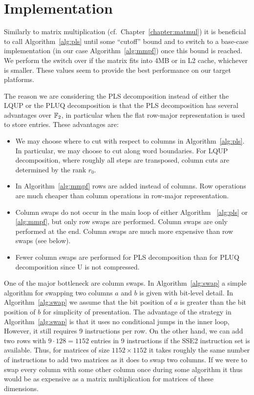 \section{Implementation}
\label{sec:pluq-implementation}
Similarly to matrix multiplication (cf.\ Chapter~\ref{chapter:matmul}) it is beneficial to call Algorithm~\ref{alg:pls} until some ``cutoff'' bound and to switch to a base-case implementation (in our case Algorithm~\ref{alg:mmpf}) once this bound is reached. We perform the switch over if the matrix fits into 4MB or in L2 cache, whichever is smaller. These values seem to provide the best performance on our target platforms.

The reason we are considering the PLS decomposition instead of either the LQUP or the PLUQ decomposition is that the PLS decomposition has several advantages over $\mathbb{F}_2$, in particular when the flat row-major representation is used to store entries. These advantages are:
\begin{itemize}
 \item We may choose where to cut with respect to columns in Algorithm~\ref{alg:pls}. In particular, we may choose to cut along word boundaries. For LQUP decomposition, where roughly all steps are transposed, column cuts are determined by the rank $r_0$.
 \item In Algorithm~\ref{alg:mmpf} rows are added instead of columns. Row operations are much cheaper than column operations in row-major representation.
 \item Column swaps do not occur in the main loop of either Algorithm ~\ref{alg:pls} or \ref{alg:mmpf}, but only row swaps are performed. Column swaps are only performed at the end. Column swaps are much more expensive than row swaps (see below).
 \item Fewer column swaps are performed for PLS decomposition than for PLUQ decomposition since U is not compressed.
\end{itemize}

One of the major bottleneck are column swaps. In Algorithm~\ref{alg:swap} a simple algorithm for swapping two columns $a$ and $b$ is given with bit-level detail. In Algorithm~\ref{alg:swap} we assume that the bit position of $a$ is greater than the bit position of $b$ for simplicity of presentation. The advantage of the strategy in Algorithm~\ref{alg:swap} is that it uses no conditional jumps in the inner loop, However, it still requires 9 instructions per row. On the other hand, we can add two rows with $9 \cdot 128 = 1152$ entries in 9 instructions if the SSE2 instruction set is available. Thus, for matrices of size $1152 \times 1152$ it takes roughly the same number of instructions to add two matrices as it does to swap two columns. If we were to swap every column with some other column once during some algorithm it thus would be as expensive as a matrix multiplication for matrices of these dimensions.

